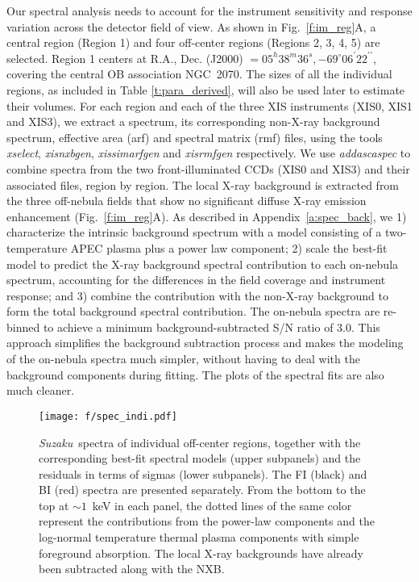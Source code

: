 \documentclass[usenatbib]{mnras}
\def\suzaku{{\sl Suzaku}}
\begin{document}
Our spectral analysis needs to account for the instrument sensitivity and response variation across the detector field of view. As shown in Fig.~\ref{f:im_reg}A, a central region (Region 1) and four off-center regions (Regions 2, 3, 4, 5) are selected. Region 1 centers at R.A., Dec. (J2000) $= 05^h 38^m 36^s, -69^{\circ}06^{\prime}22^{\prime\prime}$, covering the central OB association NGC~2070. The sizes of all the individual regions, as included in Table \ref{t:para_derived}, will also be used later  to estimate their volumes. For each region and each of the three XIS instruments (XIS0, XIS1 and XIS3), we extract a spectrum, its corresponding non-X-ray background spectrum, effective area (arf) and spectral matrix (rmf) files, using the tools \textit{xselect}, \textit{xisnxbgen}, \textit{xissimarfgen} and \textit{xisrmfgen} respectively. We use \textit{addascaspec} to combine spectra from the two front-illuminated CCDs (XIS0 and XIS3) and their associated files, region by region. The local X-ray background is extracted from the three off-nebula fields that show no significant diffuse X-ray emission enhancement (Fig.~\ref{f:im_reg}A). As described in Appendix~\ref{a:spec_back}, we 1) characterize the intrinsic background spectrum with a model consisting of a two-temperature APEC plasma plus a power law component; 2) scale the best-fit model to predict the X-ray background spectral contribution to each on-nebula spectrum, accounting for the differences in the field coverage and instrument response; and 3) combine the contribution with the non-X-ray background to form the total background spectral contribution. The on-nebula spectra are re-binned to achieve a minimum background-subtracted S/N ratio of $3.0$. This approach simplifies the background subtraction process and makes the modeling of the on-nebula spectra much simpler, without having to deal with the background components during fitting. The plots of the spectral fits are also much cleaner. 

\begin{figure*}
\centering
\texttt{[image: f/spec\_indi.pdf]}
\caption{\suzaku\ spectra of individual off-center regions, together with the corresponding best-fit spectral models (upper subpanels) and the residuals in terms of sigmas (lower subpanels). The FI (black) and BI (red) spectra are presented separately. From the bottom to the top at $\sim 1$~keV in each panel, the dotted lines of the same color represent the contributions from the power-law components and the log-normal temperature thermal plasma components with simple foreground absorption. The local X-ray backgrounds have already been subtracted along with the NXB.
}
\label{f:spec_s}
\end{figure*}
\end{document}
